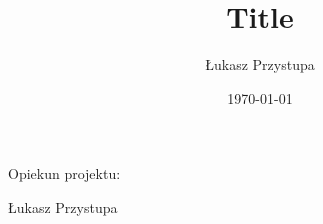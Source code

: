 \documentclass[12pt]{article}
\title{Title}
\author{Łukasz Przystupa}
\date{\today}
\numberwithin{equation}{section}
\begin{document}
    \begin{titlepage}
        \maketitle
        \thispagestyle{empty}
        \begin{center}
            Opiekun projektu: 
        \end{center}
    \end{titlepage}

    \vfill
    \begin{flushright}
        Łukasz Przystupa
    \end{flushright}
\end{document}
